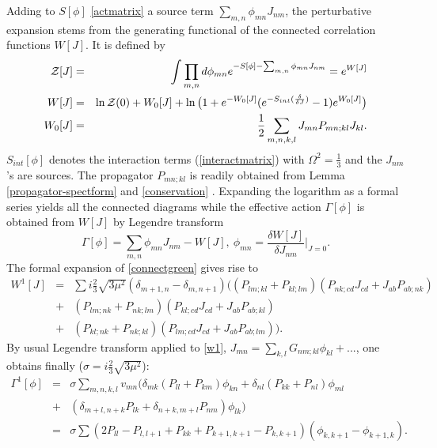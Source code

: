\documentclass[a4paper]{jpconf}
\numberwithin{equation}{section}
\newcommand{\eqn}[1]{(\ref{#1})}
\theoremstyle{nonumberplain}
\begin{document}
Adding to $S[\phi]$ \eqref{actmatrix} a source term $\sum_{m,n}\phi_{mn}J_{nm}$, the perturbative expansion stems from the generating functional of the connected correlation functions $W[J]$. It is defined by 
\begin{eqnarray}
{\cal{Z}}[J]&=&\int\prod_{m,n}d\phi_{mn}e^{-S[\phi]-\sum_{m,n}\phi_{mn}J_{nm}}=e^{W[J]}\label{generating-Z}\\
W[J]&=&\ln{\cal{Z}}(0)+W_0[J]+\ln\big(1+e^{-W_0[J]} ( e^{ -S_{int}(\frac{\delta}{\delta J})}   -1)e^{W_0[J]} \big)\label{connectgreen}\\
W_0[J]&=&\frac{1}{2}\sum_{m,n,k,l}J_{mn}P_{mn;kl}J_{kl}\label{connectfree}.
\end{eqnarray}
$S_{int}[\phi]$ denotes the interaction terms \eqn{interactmatrix} with $\Omega^2=\frac{1}{3}$ and the $J_{nm}$'s are sources. The propagator  $P_{mn;kl}$ is readily obtained from Lemma \ref{propagator-spectform} and \eqref{conservation} . Expanding the logarithm as a formal series yields all the connected diagrams while the effective action $\Gamma[\phi]$ is  obtained from $W[J]$ by Legendre transform
\begin{equation}
\Gamma[\phi]=\sum_{m,n}\phi_{mn}J_{nm}-W[J],\ \phi_{mn}=\frac{\delta W[J]}{\delta J_{nm}}\vert_{J=0}\label{effectiveaction}.
\end{equation}
The formal expansion of \eqref{connectgreen} gives rise to
\begin{eqnarray}
W^{1}[J]&=& \sum i\frac{2}{3}{\sqrt{3\mu^2}}(\delta_{m+1,n}-\delta_{m,n+1})\big((P_{lm;kl}+P_{kl;lm})(P_{nk;cd}J_{cd}+J_{ab}P_{ab;nk})\nonumber\\
&+&(P_{lm;nk}+P_{nk;lm})(P_{kl;cd}J_{cd}+J_{ab}P_{ab;kl})\nonumber\\
&+&(P_{kl;nk}+P_{nk;kl})(P_{lm;cd}J_{cd}+J_{ab}P_{ab;lm}) \big).\label{w1}
\end{eqnarray}
By usual Legendre transform applied to \eqref{w1}, $J_{mn}=\sum_{k,l}G_{nm;kl}\phi_{kl}+...$, one obtains finally ($\sigma=i\frac{2}{3}{\sqrt{3\mu^2}}$):
\begin{eqnarray}
\Gamma^1[\phi]&=&\sigma\sum_{m,n,k,l} v_{mn}\big(\delta_{mk}(P_{ll}+P_{km})\phi_{kn} +\delta_{nl}(P_{kk}+P_{nl})\phi_{ml}\nonumber\\
&+&(\delta_{m+l,n+k}P_{lk}+\delta_{n+k,m+l}P_{nm})\phi_{lk} \big)\nonumber\\
&=&\sigma\sum(2P_{ll}-P_{l,l+1}+P_{kk}+P_{k+1,k+1}-P_{k,k+1})(\phi_{k,k+1}-\phi_{k+1,k})\label{cgamma1}.
\end{eqnarray}
\end{document}
